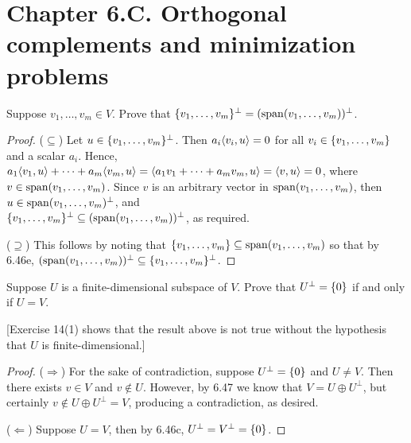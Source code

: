 \section*{Chapter 6.C. Orthogonal complements and minimization problems}


\begin{exercise}{1}
  Suppose $v_1,\dots,v_m\in V$. Prove that $\{v_1,\dots,v_m\}^\perp =(\operatorname*{span}(v_1,\dots,v_m))^\perp$.
\end{exercise}
\begin{proof}
 ($\subseteq$) Let $u\in\{v_1,\dots,v_m\}^\perp$. Then $a_i\langle v_i,u\rangle=0$ for all $v_i\in\{v_1,\dots,v_m\}$ and a scalar $a_i$. Hence, $a_1\langle v_1,u\rangle+\dots+a_m\langle v_m,u\rangle =\langle a_1v_1+\dots+a_mv_m,u\rangle =\langle v,u\rangle =0$, where $v\in\operatorname*{span}(v_1,\dots,v_m)$. Since $v$ is an arbitrary vector in $\operatorname*{span}(v_1,\dots,v_m)$, then $u\in\operatorname*{span}(v_1,\dots,v_m)^\perp$, and \\${\{v_1,\dots,v_m\}^\perp \subseteq(\operatorname*{span}(v_1,\dots,v_m))^\perp}$, as required.

 ($\supseteq$) This follows by noting that $\{v_1,\dots,v_m\}\subseteq\operatorname*{span}(v_1,\dots,v_m)$ so that by 6.46e, $(\operatorname*{span}(v_1,\dots,v_m))^\perp\subseteq\{v_1,\dots,v_m\}^\perp$.
\end{proof}

\begin{exercise}{2}
  Suppose $U$ is a finite-dimensional subspace of $V$. Prove that $U^\perp=\{0\}$ if and only if $U=V$.

  [Exercise 14(1) shows that the result above is not true without the hypothesis that $U$ is finite-dimensional.]
\end{exercise}
\begin{proof}
 ($\Rightarrow$) For the sake of contradiction, suppose $U^\perp=\{0\}$ and $U\neq V$. Then there exists $v\in V$ and $v\notin U$. However, by 6.47 we know that $V=U\oplus U^\perp$, but certainly $v\notin U\oplus U^\perp=V$, producing a contradiction, as desired.

 ($\Leftarrow$) Suppose $U=V$, then by 6.46c, $U^\perp=V^\perp=\{0\}$.
\end{proof}

